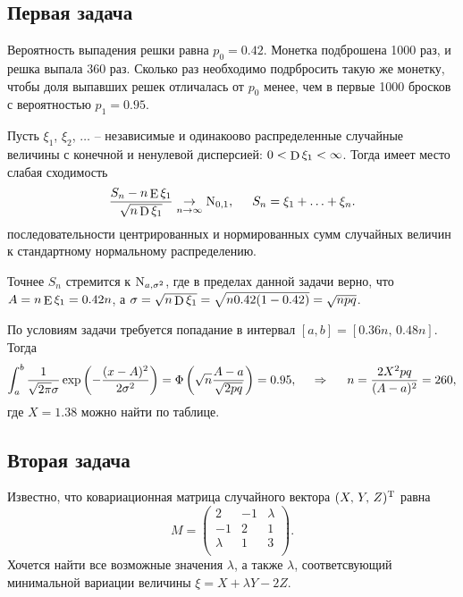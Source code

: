 
\subsection*{Первая задача}
Вероятность выпадения решки равна $p_0 = 0.42$. Монетка подброшена 1000 раз, и решка выпала 360 раз. Сколько раз необходимо подрбросить такую же монетку, чтобы доля выпавших решек отличалась от $p_0$ менее, чем в первые 1000 бросков с вероятностью $p_1 = 0.95$.

\begin{to_thr}
    Пусть $\xi_1$, $\xi_2$, $\ldots$ -- независимые и одинакоово распределенные случайные величины с конечной и ненулевой дисперсией: $0 < \mathop{\mathrm{D}}\nolimits \xi_1 < \infty$. Тогда имеет место слабая сходимость 
    \begin{equation*}
        \frac{S_n - n \mathop{\mathrm{E}}\nolimits \xi_1}{\sqrt{n \mathop{\mathrm{D}}\nolimits \xi_1}} \underset{n\to\infty}{\to} \textnormal{N}_{0, 1},
        \hspace{5 mm} 
        S_n = \xi_1 + \ldots + \xi_n.
    \end{equation*}
    последовательности центрированных и нормированных сумм случайных величин к стандартному нормальному распределению.
\end{to_thr}

Точнее $S_n$ стремится к $\textnormal{N}_{a, \sigma^2}$, где в пределах данной задачи верно, что $A = n \mathop{\mathrm{E}}\nolimits \xi_1 = 0.42 n $, а $\sigma = \sqrt{n \mathop{\mathrm{D}}\nolimits \xi_1} = \sqrt{n 0.42 (1-0.42)} = \sqrt{n p q}$. 

По условиям задачи требуется попадание в интервал $[a, b] = [0.36n,\, 0.48n]$. Тогда
\begin{equation*}
    \int_a^b \frac{1}{\sqrt{2\pi} \sigma} \exp\left(-\frac{(x-A)^2}{2 \sigma^2}\right) = \Phi\left(\sqrt{n}\frac{A-a}{\sqrt{2 pq}}\right) = 0.95, 
    \hspace{0.5cm} \Rightarrow \hspace{0.5cm}
    n = \frac{2 X^2 p q}{(A-a)^2} = 260,
\end{equation*}
где $X = 1.38$ можно найти по таблице. 




\subsection*{Вторая задача}
Известно, что ковариационная матрица случайного вектора $(X,\, Y,\, Z)^{\text{T}}$  равна
\begin{equation*}
    M = \begin{pmatrix}
        2 & -1 & \lambda \\
        -1 & 2 & 1 \\
        \lambda & 1 & 3 \\
    \end{pmatrix}.
\end{equation*}
Хочется найти все возможные значения $\lambda$, а также $\lambda$, соответсвующий минимальной вариации величины $\xi = X + \lambda Y - 2 Z$. 


